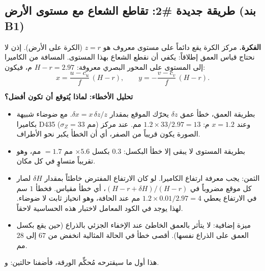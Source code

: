 \documentclass[11pt,a4paper]{article}
\newcommand{\en}[1]{\textenglish{#1}}
\newcommand{\code}[1]{\LR{\texttt{#1}}}
\begin{document}
\subsection{طريقة جديدة \#2: تقاطع الشعاع مع مستوى الأرض (بند \en{B1})}
\textbf{الفكرة.} مركز الكرة يقع دائماً على مستوى معروف هو $z=r$ (الكرة على الأرض). إذن لا نحتاج قياس العمق إطلاقاً: يكفي أن نقطع
الشعاع بهذا المستوى. المسافة من الكاميرا إلى المستوى على المحور البصري معروفة: $H-r=2.97$ م، فيكون:
\[ x=\frac{u-c_u}{f}\,(H-r),\qquad y=-\frac{v-c_v}{f}\,(H-r). \]

\textbf{تحليل الأخطاء: لماذا يُتوقع أن تكون أفضل؟}
\begin{itemize}
\item بطريقة العمق، خطأ عمق $\delta z$ يحرّك الموقع بمقدار $\delta x=x\,\delta z/z$. مع ضوضاء شبيهة بكاميرا \en{D435}
($\sigma_Z=33$ مم) وعند $x=1.2$ م: $1.2\times33/2.97=13$ مم. عند مركز الصورة يكون قريباً من الصفر، أي أن الخطأ يكبر نحو الأطراف.
\item بطريقة المستوى لا يبقى إلا خطأ البكسل: $0.3$ بكسل $\times5.6$ مم $=1.7$ مم، وهو تقريباً متساوٍ في كل مكان.
\item الثمن: يجب معرفة ارتفاع الكاميرا. لو كان الارتفاع المفترض خاطئاً بمقدار $\delta H$ لصار كل موقع مضروباً في
$(H-r+\delta H)/(H-r)$، أي خطأ مقياس. فخطأ $1$ سم في الارتفاع يعطي $1.2\times0.01/2.97=4$ مم عند الحافة، وهو انحياز ثابت لا ضوضاء.
لهذا يوجد في الكود المعامل \code{plane\_dz} لاختبار هذه الحساسية لاحقاً.
\item ميزة إضافية: لا يتأثر بالعمق الخاطئ عند الإخفاء الجزئي بالذراع (حين يقع بكسل العمق على الذراع نفسها). أقصى خطأ في الحالة
المثالية انخفض من $67$ إلى $28$ مم.
\end{itemize}
هذا أول ما سيقترحه مُحكِّم الورقة، فأضفنا حالتين: \code{plane} و\code{all\_plane}.
\end{document}
